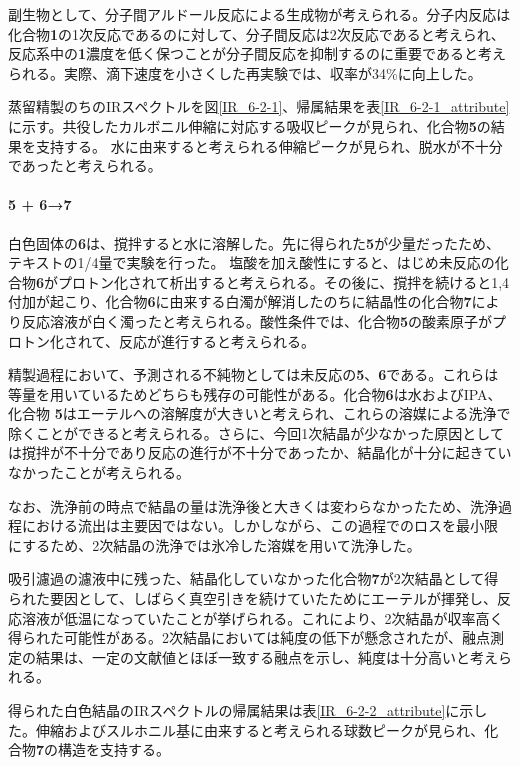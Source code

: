 \documentclass{ltjsarticle}
\theoremstyle{definition}
\numberwithin{equation}{section}
\begin{document}
副生物として、分子間アルドール反応による生成物が考えられる。分子内反応は化合物\textbf{1}の1次反応であるのに対して、分子間反応は2次反応であると考えられ、反応系中の\textbf{1}濃度を低く保つことが分子間反応を抑制するのに重要であると考えられる。実際、滴下速度を小さくした再実験では、収率が34\%に向上した。

蒸留精製のちのIRスペクトルを図\ref{IR_6-2-1}、帰属結果を表\ref{IR_6-2-1_attribute}に示す。共役したカルボニル伸縮に対応する吸収ピークが見られ、化合物\textbf{5}の結果を支持する。
水に由来すると考えられる伸縮ピークが見られ、脱水が不十分であったと考えられる。

\paragraph{\textbf{5} + \textbf{6}→\textbf{7}}
白色固体の\textbf{6}は、撹拌すると水に溶解した。先に得られた\textbf{5}が少量だったため、テキストの1/4量で実験を行った。
塩酸を加え酸性にすると、はじめ未反応の化合物\textbf{6}がプロトン化されて析出すると考えられる。その後に、撹拌を続けると1,4付加が起こり、化合物\textbf{6}に由来する白濁が解消したのちに結晶性の化合物\textbf{7}により反応溶液が白く濁ったと考えられる。酸性条件では、化合物\textbf{5}の酸素原子がプロトン化されて、反応が進行すると考えられる。

精製過程において、予測される不純物としては未反応の\textbf{5}、\textbf{6}である。これらは等量を用いているためどちらも残存の可能性がある。化合物\textbf{6}は水およびIPA、化合物
\textbf{5}はエーテルへの溶解度が大きいと考えられ、これらの溶媒による洗浄で除くことができると考えられる。さらに、今回1次結晶が少なかった原因としては撹拌が不十分であり反応の進行が不十分であったか、結晶化が十分に起きていなかったことが考えられる。

なお、洗浄前の時点で結晶の量は洗浄後と大きくは変わらなかったため、洗浄過程における流出は主要因ではない。しかしながら、この過程でのロスを最小限にするため、2次結晶の洗浄では氷冷した溶媒を用いて洗浄した。

吸引濾過の濾液中に残った、結晶化していなかった化合物\textbf{7}が2次結晶として得られた要因として、しばらく真空引きを続けていたためにエーテルが揮発し、反応溶液が低温になっていたことが挙げられる。これにより、2次結晶が収率高く得られた可能性がある。2次結晶においては純度の低下が懸念されたが、融点測定の結果は、一定の文献値とほぼ一致する融点を示し、純度は十分高いと考えられる。

得られた白色結晶のIRスペクトルの帰属結果は表\ref{IR_6-2-2_attribute}に示した。伸縮およびスルホニル基に由来すると考えられる球数ピークが見られ、化合物\textbf{7}の構造を支持する。
\end{document}
